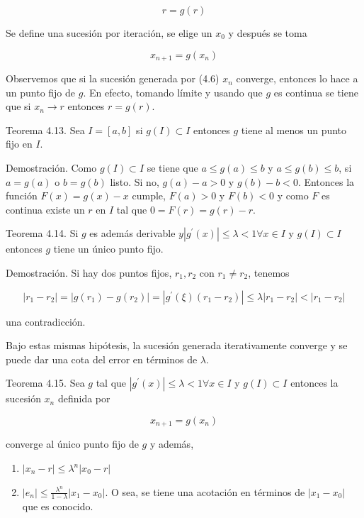 \documentclass[10pt]{book}
\begin{document}
$$
r=g(r)
$$

Se define una sucesión por iteración, se elige un $x_{0}$ y después se toma


\begin{equation*}
x_{n+1}=g\left(x_{n}\right) \tag{4.6}
\end{equation*}


Observemos que si la sucesión generada por (4.6) $x_{n}$ converge, entonces lo hace a un punto fijo de $g$. En efecto, tomando límite y usando que $g$ es continua se tiene que si $x_{n} \rightarrow r$ entonces $r=g(r)$.

Teorema 4.13. Sea $I=[a, b]$ si $g(I) \subset I$ entonces $g$ tiene al menos un punto fijo en $I$.

Demostración. Como $g(I) \subset I$ se tiene que $a \leq g(a) \leq b$ y $a \leq g(b) \leq b$, si $a=g(a)$ o $b=g(b)$ listo. Si no, $g(a)-a>0$ y $g(b)-b<0$. Entonces la función $F(x)=g(x)-x$ cumple, $F(a)>0$ y $F(b)<0$ y como $F$ es continua existe un $r$ en $I$ tal que $0=F(r)=g(r)-r$.

Teorema 4.14. Si $g$ es además derivable $y\left|g^{\prime}(x)\right| \leq \lambda<1 \forall x \in I$ y $g(I) \subset I$ entonces $g$ tiene un único punto fijo.

Demostración. Si hay dos puntos fijos, $r_{1}, r_{2}$ con $r_{1} \neq r_{2}$, tenemos

$$
\left|r_{1}-r_{2}\right|=\left|g\left(r_{1}\right)-g\left(r_{2}\right)\right|=\left|g^{\prime}(\xi)\left(r_{1}-r_{2}\right)\right| \leq \lambda\left|r_{1}-r_{2}\right|<\left|r_{1}-r_{2}\right|
$$

una contradicción.

Bajo estas mismas hipótesis, la sucesión generada iterativamente converge y se puede dar una cota del error en términos de $\lambda$.

Teorema 4.15. Sea $g$ tal que $\left|g^{\prime}(x)\right| \leq \lambda<1 \forall x \in I$ y $g(I) \subset I$ entonces la sucesión $x_{n}$ definida por

$$
x_{n+1}=g\left(x_{n}\right)
$$

converge al único punto fijo de $g$ y además,

\begin{enumerate}
  \item $\left|x_{n}-r\right| \leq \lambda^{n}\left|x_{0}-r\right|$
  \item $\left|e_{n}\right| \leq \frac{\lambda^{n}}{1-\lambda}\left|x_{1}-x_{0}\right|$. O sea, se tiene una acotación en términos de $\left|x_{1}-x_{0}\right|$ que es conocido.
\end{enumerate}
\end{document}
